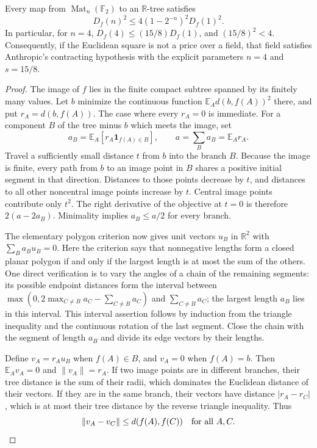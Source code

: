 \begin{theorem}
\label{pg:tree-contraction}
Every map from $\operatorname{Mat}_n(\mathbb F_2)$ to an $\mathbb R$-tree
satisfies
\[
 D_f(n)^2\leq4(1-2^{-n})^2D_f(1)^2.
\]
In particular, for $n=4$,
$D_f(4)\leq(15/8)D_f(1)$, and $(15/8)^2<4$.
Consequently, if the Euclidean square is not a price over a field, that
field satisfies Anthropic's contracting hypothesis with the explicit
parameters $n=4$ and $s=15/8$.
\end{theorem}
\begin{proof}
The image of $f$ lies in the finite compact subtree spanned by its finitely
many values. Let $b$ minimize the continuous function
$\mathbb E_A d(b,f(A))^2$ there, and put $r_A=d(b,f(A))$. The case where
every $r_A=0$ is immediate. For a component $B$ of the tree minus $b$
which meets the image, set
\[
 a_B=\mathbb E_A[r_A\mathbf1_{f(A)\in B}],\qquad
 a=\sum_Ba_B=\mathbb E_A r_A.
\]
Travel a sufficiently small distance $t$ from $b$ into the branch $B$.
Because the image is finite, every path from $b$ to an image point in $B$
shares a positive initial segment in that direction. Distances to those
points decrease by $t$, and distances to all other noncentral image points
increase by $t$. Central image points contribute only $t^2$. The right
derivative of the objective at $t=0$ is therefore $2(a-2a_B)$. Minimality
implies $a_B\leq a/2$ for every branch.

The elementary polygon criterion now gives unit vectors $u_B$ in
$\mathbb R^2$ with $\sum_Ba_Bu_B=0$. Here the criterion says that
nonnegative lengths form a closed planar polygon if and only if the
largest length is at most the sum of the others. One direct verification
is to vary the angles of a chain of the remaining segments: its possible
endpoint distances form the interval between
$\max(0,2\max_{C\ne B}a_C-\sum_{C\ne B}a_C)$ and
$\sum_{C\ne B}a_C$; the largest length $a_B$ lies in this interval.
This interval assertion follows by induction from the triangle inequality
and the continuous rotation of the last segment. Close the chain with
the segment of length $a_B$ and divide its edge vectors by their lengths.

Define $v_A=r_Au_B$ when $f(A)\in B$, and $v_A=0$ when $f(A)=b$.
Then $\mathbb E_Av_A=0$ and $\|v_A\|=r_A$. If two image points are in
different branches, their tree distance is the sum of their radii, which
dominates the Euclidean distance of their vectors. If they are in the
same branch, their vectors have distance $|r_A-r_C|$, which is at most
their tree distance by the reverse triangle inequality. Thus
\[
 \|v_A-v_C\|\leq d(f(A),f(C))
 \quad\hbox{for all }A,C.
\]


\end{proof}
